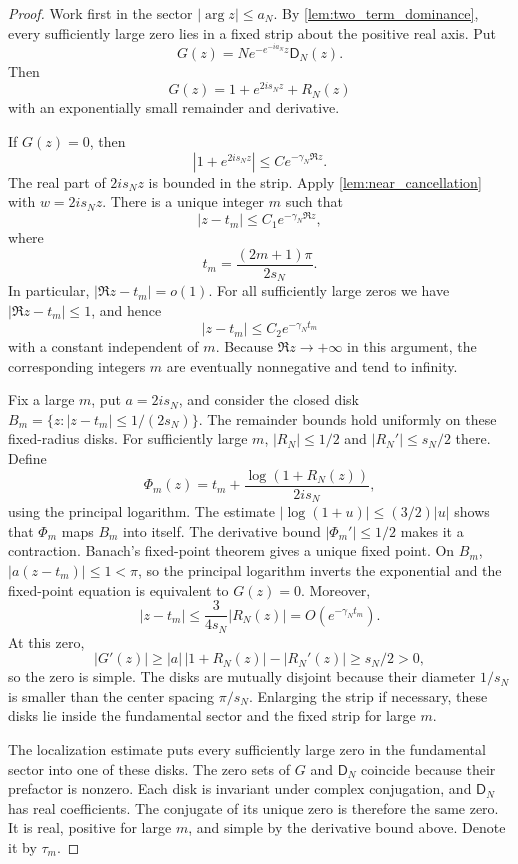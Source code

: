 \documentclass[11pt,letterpaper]{article}
\theoremstyle{definition}
\theoremstyle{remark}
\newcommand{\Dfun}{\mathsf D}
\begin{document}
\begin{proof}
Work first in the sector $|\arg z|\leq a_N$.  By \cref{lem:two_term_dominance}, every sufficiently large zero lies in a fixed strip about the positive real axis.  Put
\[
G(z)=N e^{-e^{-ia_N}z}\Dfun_N(z).
\]
Then
\[
G(z)=1+e^{2is_Nz}+R_N(z)
\]
with an exponentially small remainder and derivative.

If $G(z)=0$, then
\[
|1+e^{2is_Nz}|
\leq
C e^{-\gamma_N\Re z}.
\]
The real part of $2is_Nz$ is bounded in the strip.  Apply
\cref{lem:near_cancellation} with $w=2is_Nz$.  There is a unique
integer $m$ such that
\[
|z-t_m|\leq C_1e^{-\gamma_N\Re z},
\]
where
\[
 t_m=\frac{(2m+1)\pi}{2s_N}.
\]
In particular, $|\Re z-t_m|=o(1)$.  For all sufficiently large zeros
we have $|\Re z-t_m|\leq1$, and hence
\[
|z-t_m|\leq C_2e^{-\gamma_Nt_m}
\]
with a constant independent of $m$.
Because $\Re z\to+\infty$ in this argument, the corresponding integers
$m$ are eventually nonnegative and tend to infinity.

Fix a large $m$, put $a=2is_N$, and consider the closed disk
$B_m=\{z:|z-t_m|\leq 1/(2s_N)\}$. The remainder bounds hold
uniformly on these fixed-radius disks. For sufficiently large $m$,
$|R_N|\leq 1/2$ and $|R_N'|\leq s_N/2$ there. Define
\[
\Phi_m(z)=t_m+\frac{\log(1+R_N(z))}{2is_N},
\]
using the principal logarithm. The estimate
$|\log(1+u)|\leq(3/2)|u|$ shows that $\Phi_m$ maps $B_m$ into
itself. The derivative bound $|\Phi_m'|\leq1/2$ makes it a contraction.
Banach's fixed-point theorem gives a unique fixed point.
On $B_m$, $|a(z-t_m)|\leq1<\pi$, so the principal logarithm inverts
the exponential and the fixed-point equation is equivalent to $G(z)=0$.
Moreover,
\[
|z-t_m|\leq\frac{3}{4s_N}|R_N(z)|=O(e^{-\gamma_Nt_m}).
\]
At this zero,
\[
|G'(z)|\geq |a|\,|1+R_N(z)|-|R_N'(z)|\geq s_N/2>0,
\]
so the zero is simple. The disks are mutually disjoint because their
diameter $1/s_N$ is smaller than the center spacing $\pi/s_N$.
Enlarging the strip if necessary, these disks lie inside the fundamental
sector and the fixed strip for large $m$.

The localization estimate puts every sufficiently large zero in the
fundamental sector into one of these disks.  The zero sets of $G$ and
$\Dfun_N$ coincide because their prefactor is nonzero.  Each disk is
invariant under complex conjugation, and $\Dfun_N$ has real
coefficients.  The conjugate of its unique zero is therefore the same
zero.  It is real, positive for large $m$, and simple by the
derivative bound above.  Denote it by $\tau_m$.


\end{proof}
\end{document}
